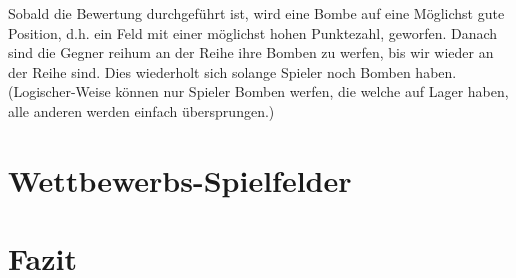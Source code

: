 \documentclass[12pt,a4paper]{article}
\begin{document}
Sobald die Bewertung durchgeführt ist, wird eine Bombe auf eine Möglichst gute Position, d.h. ein Feld mit einer möglichst hohen Punktezahl, geworfen. Danach sind die Gegner reihum an der Reihe ihre Bomben zu werfen, bis wir wieder an der Reihe sind. Dies wiederholt sich solange Spieler noch Bomben haben. (Logischer-Weise können nur Spieler Bomben werfen, die welche auf Lager haben, alle anderen werden einfach übersprungen.)
\newpage
\section{Wettbewerbs-Spielfelder}

\newpage
\section{Fazit}
\end{document}

